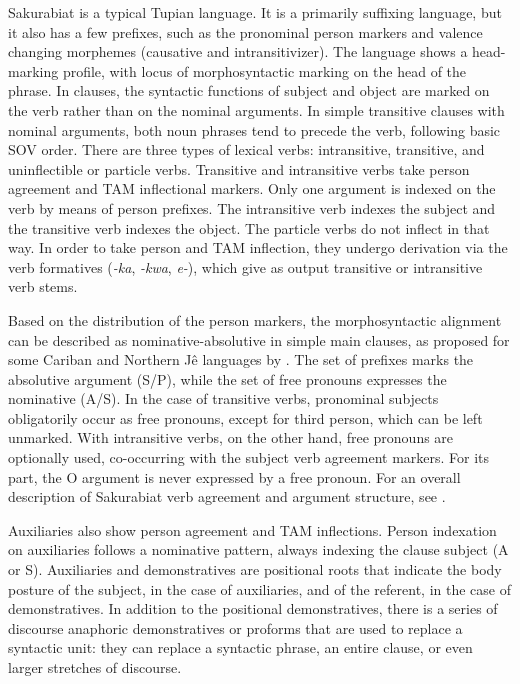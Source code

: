 \documentclass[output=paper,
modfonts,nonflat
]{langsci/langscibook}
\begin{document}
Sakurabiat is a typical Tupian language. It is a primarily suffixing language, but it also has a few prefixes, such as the  pronominal person markers and valence changing morphemes (causative and intransitivizer). The language shows a head-marking profile, with locus of morphosyntactic marking on the head of the phrase. In clauses, the syntactic functions of subject and object are marked on the verb rather than on the nominal arguments. In simple transitive clauses with nominal arguments, both noun phrases tend to precede the verb, following basic SOV order. 
There are three types of lexical verbs: intransitive, transitive, and uninflectible or particle verbs. Transitive and intransitive verbs take person agreement and TAM inflectional markers. Only one argument is indexed on the verb by means of person prefixes. The intransitive verb indexes the subject and the transitive verb indexes the object.
The particle verbs do not inflect in that way. In order to take person and TAM inflection, they undergo derivation via the verb formatives (\textit{-ka}, \textit{-kwa}, \textit{e-}), which give as output transitive or intransitive verb stems. 

Based on the distribution of the person markers, the morphosyntactic alignment can be described as nominative-absolutive in simple main clauses, as proposed for some Cariban and Northern Jê languages by \citet{GildeaEtAl2010}. The set of prefixes marks the absolutive argument (S/P), while the set of free pronouns expresses the nominative (A/S).
In the case of transitive verbs, pronominal subjects obligatorily occur as free pronouns, except for third person, which can be left unmarked. With intransitive verbs, on the other hand, free pronouns are optionally used, co-occurring  with the subject verb agreement markers. For its part, the O argument is never expressed by a free pronoun. For an overall description of Sakurabiat verb agreement and argument structure, see \citet{Galucio2014}.

\largerpage
Auxiliaries also show person agreement and TAM inflections. Person indexation on auxiliaries follows a nominative pattern, always indexing the clause subject (A or S).
Auxiliaries and demonstratives are positional roots that indicate the body posture of the subject, in the case of auxiliaries, and of the referent, in the case of demonstratives. 
In addition to the positional demonstratives, there is a series of discourse anaphoric demonstratives or proforms that are used to replace a syntactic unit: they can replace a syntactic phrase, an entire clause, or even larger stretches of discourse. 
\end{document}
